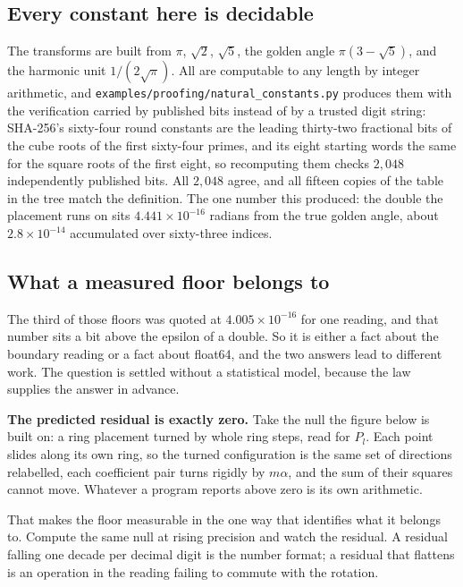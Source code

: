\subsection{Every constant here is decidable}

The transforms are built from \(\pi\), \(\sqrt2\), \(\sqrt5\), the golden angle \(\pi(3-\sqrt5)\), and the harmonic unit \(1/(2\sqrt\pi)\). All are computable to any length by integer arithmetic, and \texttt{examples/proofing/natural\_constants.py} produces them with the verification carried by published bits instead of by a trusted digit string: SHA-256's sixty-four round constants are the leading thirty-two fractional bits of the cube roots of the first sixty-four primes, and its eight starting words the same for the square roots of the first eight, so recomputing them checks \(2{,}048\) independently published bits. All \(2{,}048\) agree, and all fifteen copies of the table in the tree match the definition. The one number this produced: the double the placement runs on sits \(4.441 \times 10^{-16}\) radians from the true golden angle, about \(2.8 \times 10^{-14}\) accumulated over sixty-three indices.

\subsection{What a measured floor belongs to}
\label{sec:precisionfloor}

The third of those floors was quoted at \(4.005 \times 10^{-16}\) for one reading, and that number sits a bit above the epsilon of a double. So it is either a fact about the boundary reading or a fact about float64, and the two answers lead to different work. The question is settled without a statistical model, because the law supplies the answer in advance.

\textbf{The predicted residual is exactly zero.} Take the null the figure below is built on: a ring placement turned by whole ring steps, read for \(P_l\). Each point slides along its own ring, so the turned configuration is the same set of directions relabelled, each coefficient pair turns rigidly by \(m\alpha\), and the sum of their squares cannot move. Whatever a program reports above zero is its own arithmetic.

That makes the floor measurable in the one way that identifies what it belongs to. Compute the same null at rising precision and watch the residual. A residual falling one decade per decimal digit is the number format; a residual that flattens is an operation in the reading failing to commute with the rotation.

